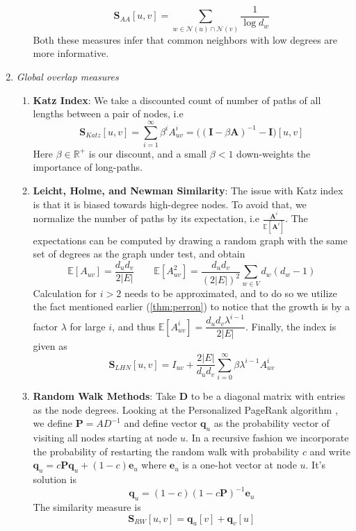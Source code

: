 \begin{enumerate}
\begin{enumerate}
\begin{equation}
	\mathbf{S}_{AA}[u, v] = \sum_{w \in \mathcal{N}(u) \cap \mathcal{N}(v)} \dfrac{1}{\log d_w}
\end{equation}
Both these measures infer that common neighbors with low degrees are more informative.
\end{enumerate}
\item \textit{Global overlap measures}
\begin{enumerate}
	\item \textbf{Katz Index}: We take a discounted count of number of paths of all lengths between a pair of nodes, i.e
	\begin{equation}
		\mathbf{S}_{Katz}[u, v] = \sum_{i=1}^\infty \beta^i A_{uv}^i = \Big((\mathbf{I} - \beta \mathbf{A})^{-1} - \mathbf{I}\Big)[u,v]
	\end{equation}
	Here $\beta \in \mathbb{R}^+$ is our discount, and a small $\beta < 1$ down-weights the importance of long-paths.
	\item \textbf{Leicht, Holme, and Newman Similarity}: The issue with Katz index is that it is biased towards high-degree nodes. To avoid that, we normalize the number of paths by its expectation, i.e $\frac{\mathbf{A}^i}{\mathbb{E}[\mathbf{A}^i]}$. The expectations can be computed by drawing a random graph with the same set of degrees as the graph under test, and obtain
	\begin{equation}
		\mathbb{E}[A_{uv}] = \dfrac{d_ud_v}{2|E|} \qquad \mathbb{E}[A_{uv}^2] = \dfrac{d_ud_v}{(2|E|)^2} \sum_{w \in V} d_w(d_w-1)
 	\end{equation}
 Calculation for $i > 2$ needs to be approximated, and to do so we utilize the fact mentioned earlier (\ref{thm:perron}) to notice that the growth is by a factor $\lambda$ for large $i$, and thus $\mathbb{E}[A_{uv}^i] = \dfrac{d_ud_v\lambda^{i-1}}{2|E|}$. Finally, the index is given as
 \begin{equation}
 	\mathbf{S}_{LHN}[u,v] = I_{uv} + \dfrac{2|E|}{d_ud_v}\sum_{i=0}^\infty \beta \lambda^{i-1}A_{uv}^i
 \end{equation}
\item \textbf{Random Walk Methods}: Take $\mathbf{D}$ to be a diagonal matrix with entries as the node degrees. Looking at the Personalized PageRank algorithm \cite{personalized-page-rank}, we define $\mathbf{P} = AD^{-1}$ and define vector $\mathbf{q}_u$ as the probability vector of visiting all nodes starting at node $u$. In a recursive fashion we incorporate the probability of restarting the random walk with probability $c$ and write $\mathbf{q}_u = c\mathbf{P}\mathbf{q}_u + (1-c)\mathbf{e}_u$ where $\mathbf{e}_u$ is a one-hot vector at node $u$. It's solution is
\begin{equation}
	\mathbf{q}_u = (1-c)(1-c\mathbf{P})^{-1}\mathbf{e}_u
\end{equation}
The similarity measure is
\begin{equation}
	\mathbf{S}_{RW}[u, v] = \mathbf{q}_u[v] + \mathbf{q}_v[u]
\end{equation}
\end{enumerate}
\end{enumerate}
